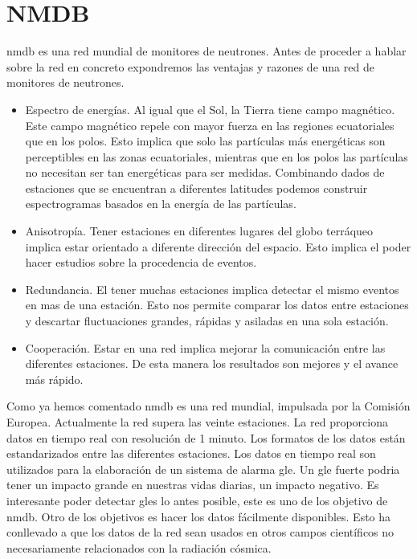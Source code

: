 \section{NMDB}
	\gls{nmdb} es una red mundial de monitores de neutrones. Antes de proceder a hablar sobre la red en concreto expondremos las ventajas y razones de
	una red de monitores de neutrones.
	\begin{itemize}
		\item 	Espectro de energías. Al igual que el Sol, la Tierra tiene campo magnético. Este campo magnético repele con mayor fuerza en
		  	las regiones ecuatoriales que en los polos. Esto implica que solo las partículas más energéticas son perceptibles en las
			zonas ecuatoriales, mientras que en los polos las partículas no necesitan ser tan energéticas para ser medidas. Combinando
			dados de estaciones que se encuentran a diferentes latitudes podemos construir espectrogramas basados en la energía de las
			partículas.
		\item 	Anisotropía. Tener estaciones en diferentes lugares del globo terráqueo implica estar orientado a diferente dirección del
		  	espacio. Esto implica el poder hacer estudios sobre la procedencia de eventos.
		\item 	Redundancia. El tener muchas estaciones implica detectar el mismo eventos en mas de una estación. Esto nos permite comparar
		  	los datos entre estaciones y descartar fluctuaciones grandes, rápidas y asiladas en una sola estación.
		\item 	Cooperación. Estar en una red implica mejorar la comunicación entre las diferentes estaciones. De esta manera los resultados
		  	son mejores y el avance más rápido. 
	\end{itemize}
	Como ya hemos comentado \gls{nmdb} es una red mundial, impulsada por la Comisión Europea. Actualmente la red supera las veinte estaciones. La red 
	proporciona datos en tiempo real con resolución de 1 minuto. Los formatos de los datos están estandarizados entre las diferentes estaciones.
	Los datos en tiempo real son utilizados para la elaboración de un sistema de alarma \gls{gle}. Un \gls{gle} fuerte podria tener un impacto grande en
	nuestras vidas diarias, un impacto negativo. Es interesante poder detectar \gls{gle}s lo antes posible, este es uno de los objetivo de \gls{nmdb}.
	Otro de los objetivos es hacer los datos fácilmente disponibles. Esto ha conllevado a que los datos de la red sean usados en otros campos 
	científicos no necesariamente relacionados con la radiación cósmica. 


